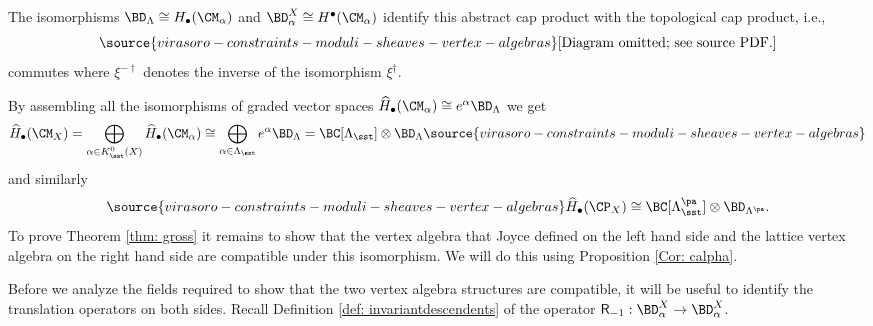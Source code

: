 The isomorphisms $\BD_{\Lambda}\cong H_\bullet(\CM_\alpha)$ and $\BD_{\alpha}^X\cong H^\bullet(\CM_\alpha)$ identify this abstract cap product with the topological cap product, i.e.,
\begin{equation}
\label{Eq: homologyisomorphism}
\source{virasoro-constraints-moduli-sheaves-vertex-algebras}
\text{[Diagram omitted; see source PDF.]}
\end{equation}
commutes where $\xi^{-\dagger}$ denotes the inverse of the isomorphism $\xi^{\dagger}$.

By assembling all the isomorphisms of graded vector spaces $\widehat H_\bullet(\CM_\alpha)\cong e^\alpha \BD_\Lambda$ we get
\begin{equation}\label{eq: isovectorspaceva}\widehat H_\bullet(\CM_X)=\bigoplus_{\alpha\in K_\sst^0(X)}\widehat H_\bullet(\CM_\alpha)\cong \bigoplus_{\alpha\in \Lambda_\sst}e^\alpha \BD_\Lambda=\BC[\Lambda_\sst]\otimes \BD_\Lambda
\source{virasoro-constraints-moduli-sheaves-vertex-algebras}
\end{equation}
and similarly
\begin{equation}\label{eq: isovectorspacevapa}
\source{virasoro-constraints-moduli-sheaves-vertex-algebras}
\widehat H_\bullet(\CP_X)\cong \BC[\Lambda_\sst^{\pa}]\otimes \BD_{\Lambda^{\pa}}.
\end{equation}
To prove Theorem \ref{thm: gross} it remains to show that the vertex algebra that Joyce defined on the left hand side and the lattice vertex algebra on the right hand side are compatible under this isomorphism. We will do this using Proposition \ref{Cor: calpha}.

Before we analyze the fields required to show that the two vertex algebra structures are compatible, it will be useful to identify the translation operators on both sides. Recall Definition \ref{def: invariantdescendents} of the operator $\mathsf{R}_{-1}: \BD^X_\alpha\to \BD^X_\alpha$.

